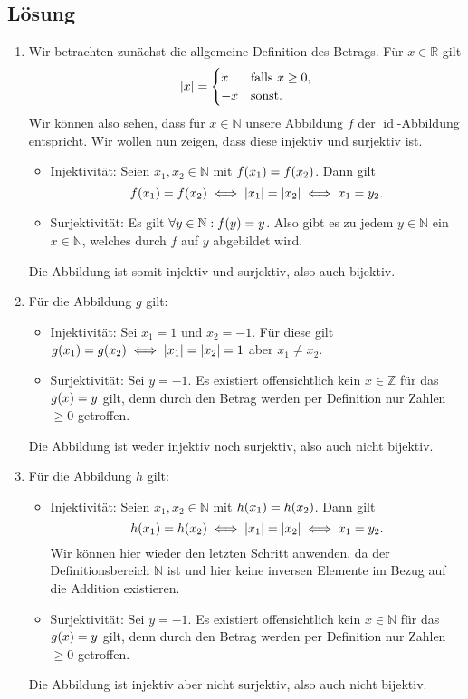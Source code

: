 \documentclass[german,12pt]{homework}
\newcommand{\NN}{\mathbb{N}}
\newcommand{\ZZ}{\mathbb{Z}}
\newcommand{\RR}{\mathbb{R}}
\DeclareMathOperator{\id}{id}
\DeclarePairedDelimiter{\absolute}{\lvert}{\rvert}
\DeclarePairedDelimiter{\enbrace}{(}{)}
\begin{document}
    \subsection*{Lösung}
    \begin{enumerate}
        \item Wir betrachten zunächst die allgemeine Definition des Betrags. Für \(x \in \RR\) gilt
        \[\absolute*{x} = \begin{cases}
            x & \text{falls }x \ge 0,\\
            -x & \text{sonst.}
        \end{cases}\]
        Wir können also sehen, dass für \(x \in \NN\) unsere Abbildung \(f\) der \(\id\)-Abbildung entspricht. Wir wollen nun zeigen, dass diese injektiv und surjektiv ist.
        \begin{itemize}
            \item Injektivität: Seien \(x_1, x_2 \in \NN\) mit \(f\enbrace*{x_1} = f\enbrace*{x_2}\). Dann gilt
            \[f\enbrace*{x_1} = f\enbrace*{x_2} \iff \absolute*{x_1} = \absolute*{x_2} \iff x_1 = y_2.\]
            \item Surjektivität: Es gilt \({\forall}y \in \NN: f\enbrace*{y} = y\). Also gibt es zu jedem \(y \in \NN\) ein \(x \in \NN\), welches durch \(f\) auf \(y\) abgebildet wird.
        \end{itemize}
        Die Abbildung ist somit injektiv und surjektiv, also auch bijektiv.
        \item Für die Abbildung \(g\) gilt:
        \begin{itemize}
            \item Injektivität: Sei \(x_1 = 1\) und \(x_2 = -1\). Für diese gilt \(g\enbrace*{x_1} = g\enbrace*{x_2} \iff \absolute*{x_1} = \absolute*{x_2} = 1\) aber \(x_1 \ne x_2\).
            \item Surjektivität: Sei \(y = -1\). Es existiert offensichtlich kein \(x \in \ZZ\) für das \(g\enbrace*{x} = y\) gilt, denn durch den Betrag werden per Definition nur Zahlen \(\ge 0\) getroffen.
        \end{itemize}
        Die Abbildung ist weder injektiv noch surjektiv, also auch nicht bijektiv.
        \item Für die Abbildung \(h\) gilt:
        \begin{itemize}
            \item Injektivität: Seien \(x_1, x_2 \in \NN\) mit \(h\enbrace*{x_1} = h\enbrace*{x_2}\). Dann gilt
            \[h\enbrace*{x_1} = h\enbrace*{x_2} \iff \absolute*{x_1} = \absolute*{x_2} \iff x_1 = y_2.\]
            Wir können hier wieder den letzten Schritt anwenden, da der Definitionsbereich \(\NN\) ist und hier keine inversen Elemente im Bezug auf die Addition existieren.
            \item Surjektivität: Sei \(y = -1\). Es existiert offensichtlich kein \(x \in \NN\) für das \(g\enbrace*{x} = y\) gilt, denn durch den Betrag werden per Definition nur Zahlen \(\ge 0\) getroffen.
        \end{itemize}
        Die Abbildung ist injektiv aber nicht surjektiv, also auch nicht bijektiv.
    \end{enumerate}
\end{document}
